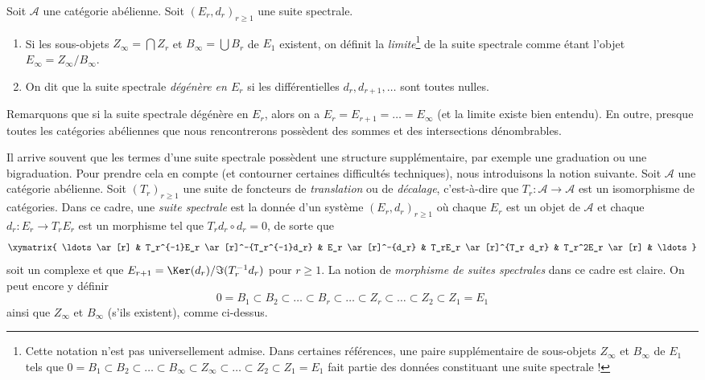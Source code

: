 \begin{definition}
\label{definition-limit-spectral-sequence}
Soit $\mathcal{A}$ une catégorie abélienne.
Soit $(E_r, d_r)_{r \geq 1}$ une suite spectrale.
\begin{enumerate}
\item Si les sous-objets $Z_{\infty} = \bigcap Z_r$
et $B_{\infty} = \bigcup B_r$ de $E_1$ existent, on définit
la {\it limite}\footnote{Cette notation n'est pas universellement admise. Dans certaines
références, une paire supplémentaire de sous-objets
$Z_\infty$ et $B_\infty$ de $E_1$ tels que
$0 = B_1 \subset B_2 \subset \ldots \subset B_\infty \subset Z_\infty
\subset \ldots \subset Z_2 \subset Z_1 = E_1$
fait partie des données constituant une suite spectrale !}
de la suite spectrale comme étant l'objet
$E_{\infty} = Z_{\infty}/B_{\infty}$.
\item On dit que la suite spectrale {\it dégénère en $E_r$}
si les différentielles $d_r, d_{r + 1}, \ldots$ sont toutes nulles.
\end{enumerate}
\end{definition}

\noindent
Remarquons que si la suite spectrale dégénère en $E_r$, alors
on a $E_r = E_{r + 1} = \ldots = E_{\infty}$ (et la limite
existe bien entendu). En outre, presque toutes les catégories abéliennes que nous rencontrerons
possèdent des sommes et des intersections dénombrables.

\begin{remark}[Variante]
\label{remark-allow-translation-functors}
Il arrive souvent que les termes d'une suite spectrale possèdent une
structure supplémentaire, par exemple une graduation ou une bigraduation.
Pour prendre cela en compte (et contourner certaines difficultés techniques),
nous introduisons la notion suivante. Soit $\mathcal{A}$ une
catégorie abélienne. Soit $(T_r)_{r \geq 1}$ une
suite de foncteurs de {\it translation} ou de {\it décalage}, c'est-à-dire que
$T_r : \mathcal{A} \to \mathcal{A}$ est un isomorphisme de catégories.
Dans ce cadre, une {\it suite spectrale} est la donnée d'un système
$(E_r, d_r)_{r \geq 1}$ où chaque $E_r$ est un objet de
$\mathcal{A}$ et chaque $d_r : E_r \to T_rE_r$
est un morphisme tel que $T_rd_r \circ d_r = 0$, de sorte que
$$
\xymatrix{
\ldots \ar[r] &
T_r^{-1}E_r \ar[r]^-{T_r^{-1}d_r} &
E_r \ar[r]^-{d_r} &
T_rE_r \ar[r]^{T_r d_r} &
T_r^2E_r \ar[r] & \ldots
}
$$
soit un complexe et que $E_{r + 1} = \Ker(d_r)/\Im(T_r^{-1}d_r)$ pour $r \geq 1$.
La notion de {\it morphisme de suites spectrales}
dans ce cadre est claire. On peut encore y définir
$$
0 = B_1 \subset B_2 \subset \ldots \subset B_r \subset \ldots
\subset Z_r \subset \ldots \subset Z_2 \subset Z_1 = E_1
$$
ainsi que $Z_\infty$ et $B_\infty$ (s'ils existent), comme ci-dessus.
\end{remark}










